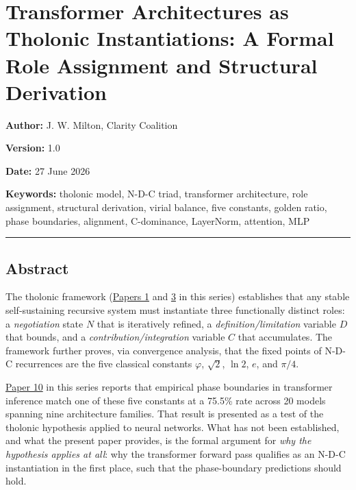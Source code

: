 \documentclass[
  11pt,
  letterpaper,
]{article}
\author{}
\date{}
\begin{document}
\section{Transformer Architectures as Tholonic Instantiations: A Formal
Role Assignment and Structural
Derivation}\label{transformer-architectures-as-tholonic-instantiations-a-formal-role-assignment-and-structural-derivation}

\textbf{Author:} J. W. Milton, Clarity Coalition

\textbf{Version:} 1.0

\textbf{Date:} 27 June 2026

\textbf{Keywords:} tholonic model, N-D-C triad, transformer
architecture, role assignment, structural derivation, virial balance,
five constants, golden ratio, phase boundaries, alignment, C-dominance,
LayerNorm, attention, MLP

\begin{center}\rule{0.5\linewidth}{0.5pt}\end{center}

\subsection{Abstract}\label{abstract}

The tholonic framework
(\href{https://github.com/baardev/truevalue/blob/main/docnav/Research/papers/1_recursive-tholonic-five-constants/1_recursive-tholonic-five-constants.pdf}{Papers
1} and
\href{https://github.com/baardev/truevalue/blob/main/docnav/Research/papers/3_minimal-recursive-triadic-framework/3_minimal-recursive-triadic-framework.pdf}{3}
in this series) establishes that any stable self-sustaining recursive
system must instantiate three functionally distinct roles: a
\emph{negotiation} state \(N\) that is iteratively refined, a
\emph{definition/limitation} variable \(D\) that bounds, and a
\emph{contribution/integration} variable \(C\) that accumulates. The
framework further proves, via convergence analysis, that the fixed
points of N-D-C recurrences are the five classical constants
\(\varphi\), \(\sqrt{2}\), \(\ln 2\), \(e\), and \(\pi/4\).

\href{https://github.com/baardev/truevalue/blob/main/docnav/Research/papers/10_tholonic-neural-architecture/10_tholonic-neural-architecture.pdf}{Paper
10} in this series reports that empirical phase boundaries in
transformer inference match one of these five constants at a 75.5\% rate
across 20 models spanning nine architecture families. That result is
presented as a test of the tholonic hypothesis applied to neural
networks. What has not been established, and what the present paper
provides, is the formal argument for \emph{why the hypothesis applies at
all}: why the transformer forward pass qualifies as an N-D-C
instantiation in the first place, such that the phase-boundary
predictions should hold.
\end{document}
